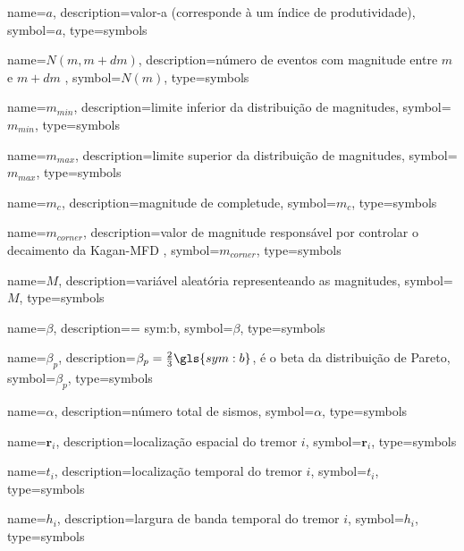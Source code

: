 {
	name={\ensuremath{a}},
	description={valor-a (corresponde à um índice de produtividade)},
	symbol={\ensuremath{a}},
	type=symbols
}


{
	name={\ensuremath{N(m,m+dm)}},
	description={número de eventos com magnitude entre $m$ e $m + dm$ },
	symbol={\ensuremath{N(m)}},
	type=symbols
}


{
	name={\ensuremath{m_{min}}},
	description={limite inferior da distribuição de magnitudes},
	symbol={\ensuremath{m_{min}}},
	type=symbols
}

{
	name={\ensuremath{m_{max}}},
	description={limite superior da distribuição de magnitudes},
	symbol={\ensuremath{m_{max}}},
	type=symbols
}

{
	name={\ensuremath{m_c}},
	description={magnitude de completude},
	symbol={\ensuremath{m_c}},
	type=symbols
}

{
	name={\ensuremath{m_{corner}}},
	description={valor de magnitude responsável por controlar o decaimento da Kagan-MFD },
	symbol={\ensuremath{m_{corner}}},
	type=symbols
}

{
	name={\ensuremath{M}},
	description={variável aleatória representeando as magnitudes},
	symbol={\ensuremath{M}},
	type=symbols
}

{
	name={\ensuremath{\beta}},
	description={\beta = \gls{sym:b}},
	symbol={\ensuremath{\beta}},
	type=symbols
}

{
	name={\ensuremath{\beta_p}},
	description={$\beta_p = \frac{2}{3}\gls{sym:b}$, é o beta da distribuição de Pareto},
	symbol={\ensuremath{\beta_p}},
	type=symbols
}

{
	name={\ensuremath{\alpha}},
	description={número total de sismos},
	symbol={\ensuremath{\alpha}},
	type=symbols
}


{
	name={\ensuremath{\boldsymbol{r}_i}},
	description={localização espacial do tremor $i$},
	symbol={\ensuremath{\boldsymbol{r}_i}},
	type=symbols
}


{
	name={\ensuremath{t_i}},
	description={localização temporal do tremor $i$},
	symbol={\ensuremath{t_i}},
	type=symbols
}


{
	name={\ensuremath{h_i}},
	description={largura de banda temporal do tremor $i$},
	symbol={\ensuremath{h_i}},
	type=symbols
}


